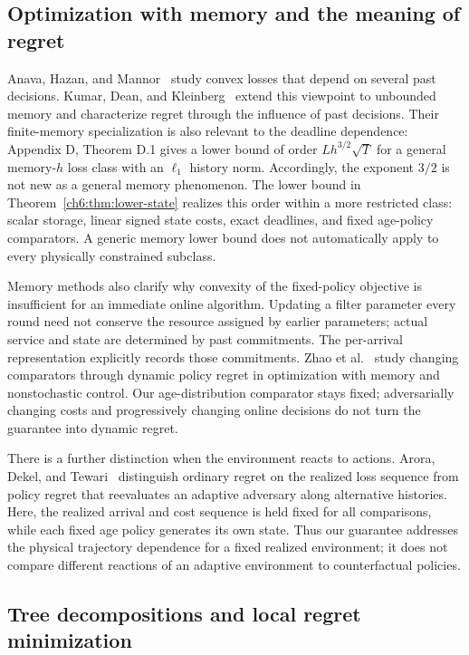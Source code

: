 \documentclass[11pt]{article}
\theoremstyle{plain}
\theoremstyle{remark}
\numberwithin{equation}{section}
\begin{document}
\subsection{Optimization with memory and the meaning of regret}
\label{ch6:subsec:related-memory}

Anava, Hazan, and Mannor~\cite{anava2015memory} study convex losses that
depend on several past decisions. Kumar, Dean, and
Kleinberg~\cite{kumar2023unbounded} extend this viewpoint to unbounded
memory and characterize regret through the influence of past decisions.
Their finite-memory specialization is also relevant to the deadline
dependence: Appendix D, Theorem D.1 gives a lower bound of order
$L h^{3/2}\sqrt T$ for a general memory-$h$ loss class with an
$\ell_1$ history norm. Accordingly, the exponent $3/2$ is not new as a
general memory phenomenon. The lower bound in
Theorem~\ref{ch6:thm:lower-state} realizes this order within a more
restricted class: scalar storage, linear signed state costs, exact
deadlines, and fixed age-policy comparators. A generic memory lower bound
does not automatically apply to every physically constrained subclass.

Memory methods also clarify why convexity of the fixed-policy objective
is insufficient for an immediate online algorithm. Updating a filter
parameter every round need not conserve the resource assigned by earlier
parameters; actual service and state are determined by past commitments.
The per-arrival representation explicitly records those commitments.
Zhao et al.~\cite{zhao2023nonstationary} study changing comparators through
dynamic policy regret in optimization with memory and nonstochastic
control. Our age-distribution comparator stays fixed; adversarially
changing costs and progressively changing online decisions do not turn
the guarantee into dynamic regret.

There is a further distinction when the environment reacts to actions.
Arora, Dekel, and Tewari~\cite{arora2012policy} distinguish ordinary regret
on the realized loss sequence from policy regret that reevaluates an
adaptive adversary along alternative histories. Here, the realized
arrival and cost sequence is held fixed for all comparisons, while each
fixed age policy generates its own state. Thus our guarantee addresses
the physical trajectory dependence for a fixed realized environment;
it does not compare different reactions of an adaptive environment to
counterfactual policies.

\subsection{Tree decompositions and local regret minimization}
\label{ch6:subsec:related-tree}
\end{document}
